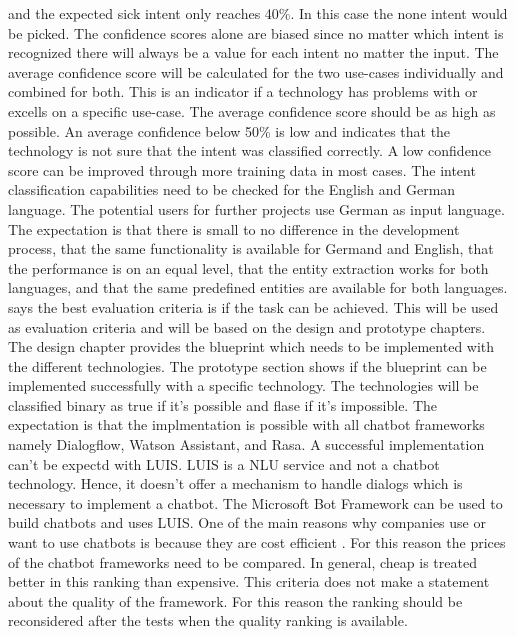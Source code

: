 and the expected sick intent only reaches 40\%.
In this case the none intent would be picked.
The confidence scores alone are biased since no matter 
which intent is recognized there will always be a value for 
each intent no matter the input.
The average confidence score will be calculated for the 
two use-cases individually and combined for both.
This is an indicator if a technology has problems with or excells
on a specific use-case.
The average confidence score should be as high as possible.
An average confidence below 50\% is low and indicates 
that the technology is not sure that the intent was 
classified correctly.
A low confidence score can be improved through more training data
in most cases. 
The intent classification capabilities need to be checked for the English and German 
language.
The potential users for further projects use German as input language.
The expectation is that there is small to no difference in the development process, 
that the same functionality is available for Germand and English,
that the performance is on an equal level, that the 
entity extraction works for both languages, and that 
the same predefined entities are available for both languages.
\citet{singhbuilding} says the best evaluation criteria is if the 
task can be achieved.
This will be used as evaluation criteria and will be based on the 
design and prototype chapters.
The design chapter provides the blueprint which needs to be 
implemented with the different technologies.
The prototype section shows if the blueprint can be 
implemented successfully with a specific technology.
The technologies will be classified binary as true if it's possible and 
flase if it's impossible.
The expectation is that the implmentation is possible with 
all chatbot frameworks namely Dialogflow, Watson Assistant, and Rasa.
A successful implementation can't be expectd with LUIS.
LUIS is a NLU service and not a chatbot technology.
Hence, it doesn't offer a mechanism to handle dialogs which is 
necessary to implement a chatbot.
The Microsoft Bot Framework can be used to build chatbots 
and uses LUIS.
One of the main reasons why companies use or want to use chatbots is because they are cost efficient \citet{buiildChatbotsPython}.
For this reason the prices of the chatbot frameworks need to be compared.
In general, cheap is treated better in this ranking than expensive.
This criteria does not make a statement about the quality of the framework.
For this reason the ranking should be reconsidered after the tests when the 
quality ranking is available.
